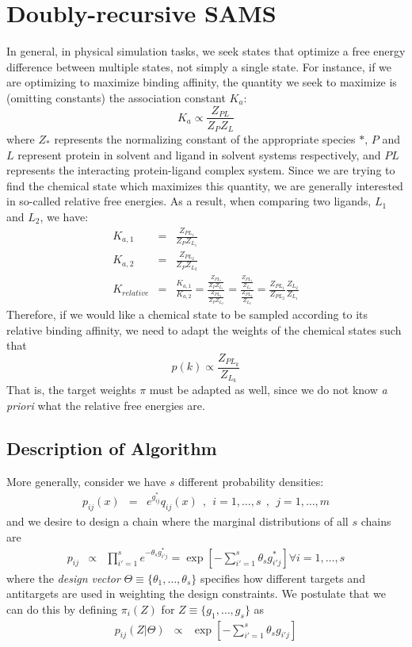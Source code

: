 \section{Doubly-recursive SAMS}
%
In general, in physical simulation tasks, we seek states that optimize a free energy difference between multiple states, not simply a single state.
%
For instance, if we are optimizing to maximize binding affinity, the quantity we seek to maximize is (omitting constants) the association constant $K_a$:
%
\begin{equation}
    K_a \propto \frac{Z_{PL}}{Z_{P}Z_{L}}
\end{equation}
%
\noindent where $Z_*$ represents the normalizing constant of the appropriate species $*$, $P$ and $L$ represent protein in solvent and ligand in solvent systems respectively, and $PL$ represents the interacting protein-ligand complex system.
%
Since we are trying to find the chemical state which maximizes this quantity, we are generally interested in so-called relative free energies.
%
As a result, when comparing two ligands, $L_1$ and $L_2$, we have:
\begin{eqnarray}
     K_{a,1} &=& \frac{Z_{PL_1}}{Z_{P}Z_{L_1}} \\
     K_{a,2} &=& \frac{Z_{PL_2}}{Z_{P}Z_{L_2}} \\
     K_{relative} &=& \frac{K_{a,1}}{K_{a,2}} = \frac{\frac{Z_{PL_1}}{Z_{P}Z_{L_1}}}{\frac{Z_{PL_2}}{Z_{P}Z_{L_2}}} = \frac{\frac{Z_{PL_1}}{Z_{L_1}}}{\frac{Z_{PL_2}}{Z_{L_2}}} = \frac{Z_{PL_1}}{Z_{PL_2}} \frac{Z_{L_2}}{Z_{L_1}}
\end{eqnarray}
%
\noindent Therefore, if we would like a chemical state to be sampled according to its relative binding affinity, we need to adapt the weights of the chemical states such that
%
\begin{equation}
    p(k) \propto \frac{Z_{PL_k}}{Z_{L_k}}
\end{equation}
%
That is, the target weights $\pi$ must be adapted as well, since we do not know \emph{a priori} what the relative free energies are.
%
\subsection{Description of Algorithm}
%
More generally, consider we have $s$ different probability densities:
%
\begin{eqnarray}
p_{ij}(x) &=& e^{g_{ij}^*} q_{ij}(x) \:\:,\:\: i = 1,\ldots, s\:\:, \:\: j = 1,\ldots, m
\end{eqnarray}
%
and we desire to design a chain where the marginal distributions of all $s$ chains are
%
\begin{eqnarray}
p_{ij} &\propto& \prod_{i'=1}^s e^{-\theta_s g_{i'j}^*} = \exp\left[ - \sum_{i'=1}^s \theta_s g_{i'j}^* \right] \forall i = 1,\ldots, s
\end{eqnarray}
%
where the \emph{design vector} $\Theta \equiv \{ \theta_1, \ldots, \theta_s \}$ specifies how different targets and antitargets are used in weighting the design constraints.
%
We postulate that we can do this by defining $\pi_i(Z)$ for $Z \equiv \{g_1, \ldots, g_s\}$ as
%
\begin{eqnarray}
p_{ij}(Z | \Theta) &\propto& \exp\left[ - \sum_{i'=1}^s \theta_s g_{i'j} \right]
\end{eqnarray}
%
